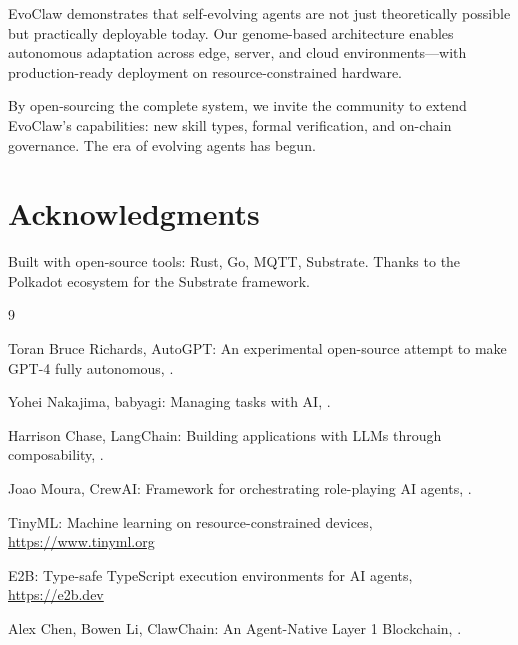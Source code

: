 \documentclass{article}
\begin{document}
EvoClaw demonstrates that self-evolving agents are not just theoretically possible but practically deployable today. Our genome-based architecture enables autonomous adaptation across edge, server, and cloud environments—with production-ready deployment on resource-constrained hardware. 

By open-sourcing the complete system, we invite the community to extend EvoClaw's capabilities: new skill types, formal verification, and on-chain governance. The era of evolving agents has begun.

\section*{Acknowledgments}

Built with open-source tools: Rust, Go, MQTT, Substrate. Thanks to the Polkadot ecosystem for the Substrate framework.


\begin{thebibliography}{9}

Toran Bruce Richards,
\newblock AutoGPT: An experimental open-source attempt to make GPT-4 fully autonomous,
.

Yohei Nakajima,
\newblock babyagi: Managing tasks with AI,
.

Harrison Chase,
\newblock LangChain: Building applications with LLMs through composability,
.

Joao Moura,
\newblock CrewAI: Framework for orchestrating role-playing AI agents,
.

\newblock TinyML: Machine learning on resource-constrained devices,
\newblock \url{https://www.tinyml.org}

\newblock E2B: Type-safe TypeScript execution environments for AI agents,
\newblock \url{https://e2b.dev}

Alex Chen, Bowen Li,
\newblock ClawChain: An Agent-Native Layer 1 Blockchain,
.

\end{thebibliography}
\end{document}
